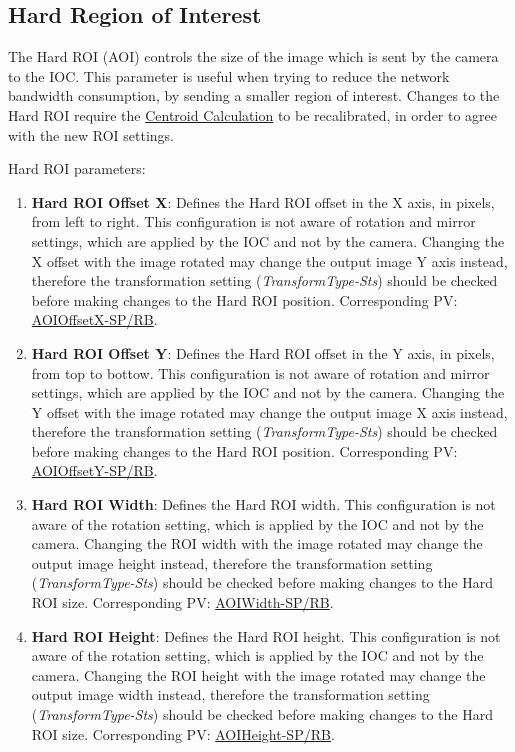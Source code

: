 \documentclass[openany]{article}
\begin{document}
    \subsection{Hard Region of Interest}\label{sec:hard-roi}

        The Hard ROI (AOI) controls the size of the image which is sent by the camera to the IOC. This parameter is useful when trying to reduce the network bandwidth consumption, by sending a smaller region of interest. Changes to the Hard ROI require the \hyperref[sec:centroid-calc]{Centroid Calculation} to be recalibrated, in order to agree with the new ROI settings.

        Hard ROI parameters:
        \begin{enumerate}
            \item \textbf{Hard ROI Offset X}: Defines the Hard ROI offset in the X axis, in pixels, from left to right. This configuration is not aware of rotation and mirror settings, which are applied by the IOC and not by the camera. Changing the X offset with the image rotated may change the output image Y axis instead, therefore the transformation setting (\emph{TransformType-Sts}) should be checked before making changes to the Hard ROI position. Corresponding PV: \hyperlink{pv:hard-roi-off-x}{AOIOffsetX-SP/RB}.
            \item \textbf{Hard ROI Offset Y}: Defines the Hard ROI offset in the Y axis, in pixels, from top to bottow. This configuration is not aware of rotation and mirror settings, which are applied by the IOC and not by the camera. Changing the Y offset with the image rotated may change the output image X axis instead, therefore the transformation setting (\emph{TransformType-Sts}) should be checked before making changes to the Hard ROI position. Corresponding PV: \hyperlink{pv:hard-roi-off-y}{AOIOffsetY-SP/RB}.
            \item \textbf{Hard ROI Width}: Defines the Hard ROI width. This configuration is not aware of the rotation setting, which is applied by the IOC and not by the camera. Changing the ROI width with the image rotated may change the output image height instead, therefore the transformation setting (\emph{TransformType-Sts}) should be checked before making changes to the Hard ROI size. Corresponding PV: \hyperlink{pv:hard-roi-width}{AOIWidth-SP/RB}.
            \item \textbf{Hard ROI Height}: Defines the Hard ROI height. This configuration is not aware of the rotation setting, which is applied by the IOC and not by the camera. Changing the ROI height with the image rotated may change the output image width instead, therefore the transformation setting (\emph{TransformType-Sts}) should be checked before making changes to the Hard ROI size. Corresponding PV: \hyperlink{pv:hard-roi-height}{AOIHeight-SP/RB}.

\end{enumerate}
\end{document}
